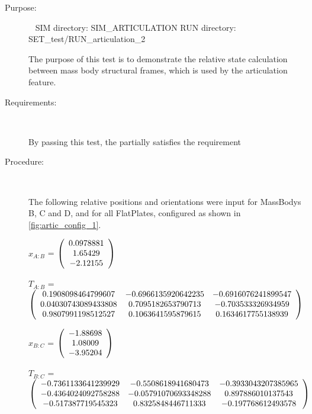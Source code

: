 \begin{description}

\item[Purpose:] \ \newline
SIM directory: SIM\_ARTICULATION
RUN directory: SET\_test/RUN\_articulation\_2

The purpose of this test is to demonstrate the relative state calculation
between mass body structural frames, which is used by the articulation
feature.

\item[Requirements:] \ \newline

By passing this test, the \ModelDesc partially satisfies
the requirement 

\item[Procedure:] \ \newline

The following relative positions and orientations were input for MassBodys
B, C and D, and for all FlatPlates, configured as shown in
\ref{fig:artic_config_1}.

$x_{A:B}$ = $\left( \begin{array} {ccc}  0.0978881 \\    1.65429 \\   -2.12155
\end{array} \right)\\ \\$

$T_{A:B}$ = $\left( \begin{array} {ccc}
   0.1908098464799607 & -0.6966135920642235 & -0.6916076241899547 \\
   0.04030743089433808 & 0.7095182653790713 & -0.703533326934959 \\
   0.9807991198512527 & 0.1063641595879615 & 0.1634617755138939 \\
\end{array} \right)\\ \\$

$x_{B:C}$ = $\left( \begin{array} {ccc}   -1.88698 \\    1.08009 \\   -3.95204
\end{array} \right)\\ \\$

$T_{B:C}$ = $\left( \begin{array} {ccc}
   -0.7361133641239929 & -0.5508618941680473 & -0.3933043207385965 \\
   -0.4364024092758288 & -0.05791070693348288 & 0.897886010137543 \\
   -0.517387719545323 & 0.8325848446711333 & -0.197768612493578 \\
\end{array} \right)\\ \\$


\end{description}
